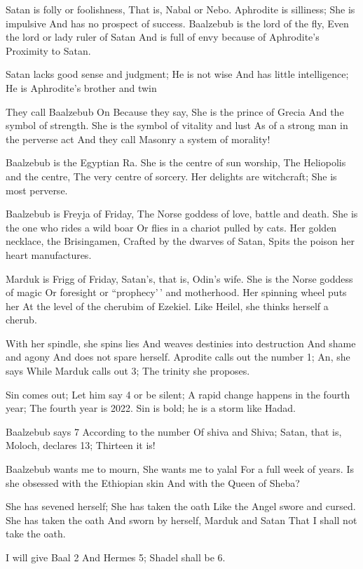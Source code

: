 \documentclass[
]{book}
\begin{document}
Satan is folly or foolishness,
That is, Nabal or Nebo.
Aphrodite is silliness;
She is impulsive
And has no prospect of success.
Baalzebub is the lord of the fly,
Even the lord or lady ruler of Satan
And is full of envy because of Aphrodite's
Proximity to Satan.

Satan lacks good sense and judgment;
He is not wise
And has little intelligence;
He is Aphrodite's brother and twin

They call Baalzebub On
Because they say,
She is the prince of Grecia
And the symbol of strength.
She is the symbol of vitality and lust
As of a strong man in the perverse act
And they call Masonry a system of morality!

Baalzebub is the Egyptian Ra.
She is the centre of sun worship,
The Heliopolis and the centre,
The very centre of sorcery.
Her delights are witchcraft;
She is most perverse.

Baalzebub is Freyja of Friday,
The Norse goddess of love, battle and death.
She is the one who rides a wild boar
Or flies in a chariot pulled by cats.
Her golden necklace, the Brisingamen,
Crafted by the dwarves of Satan,
Spits the poison her heart manufactures.

Marduk is Frigg of Friday,
Satan's, that is, Odin's wife.
She is the Norse goddess of magic
Or foresight or ``prophecy'\,' and motherhood.
Her spinning wheel puts her
At the level of the cherubim of Ezekiel.
Like Heilel, she thinks herself a cherub.

With her spindle, she spins lies
And weaves destinies into destruction
And shame and agony
And does not spare herself.
Aprodite calls out the number 1;
An, she says
While Marduk calls out 3;
The trinity she proposes.

Sin comes out;
Let him say 4 or be silent;
A rapid change happens in the fourth year;
The fourth year is 2022.
Sin is bold; he is a storm like Hadad.

Baalzebub says 7
According to the number
Of shiva and Shiva;
Satan, that is, Moloch, declares 13;
Thirteen it is!

Baalzebub wants me to mourn,
She wants me to yalal
For a full week of years.
Is she obsessed with the Ethiopian skin
And with the Queen of Sheba?

She has sevened herself;
She has taken the oath
Like the Angel swore and cursed.
She has taken the oath
And sworn by herself, Marduk and Satan
That I shall not take the oath.

I will give Baal 2
And Hermes 5;
Shadel shall be 6.
\end{document}
